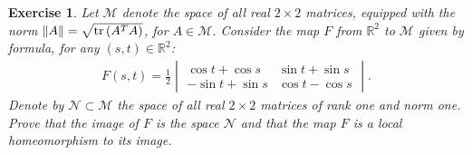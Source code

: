 \documentclass[11pt]{article}
\newtheorem{exercise}{Exercise}[section]
\theoremstyle{definition}
\numberwithin{equation}{subsection}
\begin{document}
\begin{exercise}
Let $\mathcal{M}$ denote the space of all real $2 \times 2$ matrices, equipped with the norm $\|A\| = \sqrt{{\rm tr} \left(A^T A\right)}$, for $A \in \mathcal{M}$. Consider the map $F$ from $\mathbb{R}^2$ to $\mathcal{M}$ given by formula, for any $(s,t) \in \mathbb{R}^2$:
\begin{align*}
    F(s,t) = \frac{1}{2} 
    \begin{vmatrix}
        \cos t + \cos s & \sin t + \sin s \\
        - \sin t + \sin s & \cos t - \cos s
    \end{vmatrix}.
\end{align*}
Denote by $\mathcal{N} \subset \mathcal{M}$ the space of all real $2 \times 2$ matrices of rank one and norm one. Prove that the image of $F$ is the space $\mathcal{N}$ and that the map $F$ is a local homeomorphism to its image. 
\end{exercise}
\end{document}
